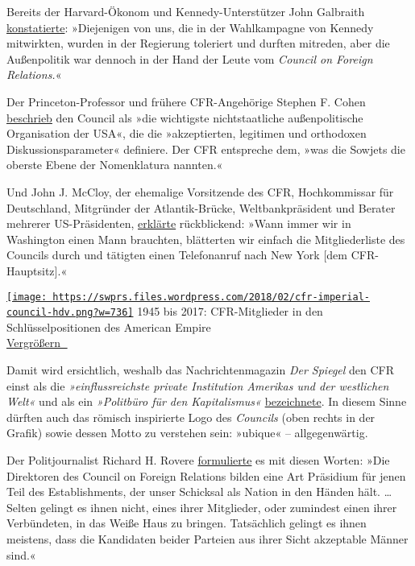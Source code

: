 Bereits der Harvard-Ökonom und Kennedy-Unterstützer John Galbraith
\href{https://books.google.com/books?id=U_WoXcJq_1wC\&q=\%22council+on+foreign+relations+people\%22}{konstatierte}:
»Diejenigen von uns, die in der Wahlkampagne von Kennedy mitwirkten,
wurden in der Regierung toleriert und durften mitreden, aber die
Außenpolitik war dennoch in der Hand der Leute vom \emph{Council on
Foreign Relations.}«

Der Princeton-Professor und frühere CFR-Angehörige Stephen F. Cohen
\href{https://www.thenation.com/article/the-american-bipartisan-policy-establishment-declares-its-second-cold-war-vs-russia-after-years-of-denying-it/}{beschrieb}
den Council als »die wichtigste nichtstaatliche außenpolitische
Organisation der USA«, die die »akzeptierten, legitimen und orthodoxen
Diskussionsparameter« definiere. Der CFR entspreche dem, »was die
Sowjets die oberste Ebene der Nomenklatura nannten.«

Und John J. McCloy, der ehemalige Vorsitzende des CFR, Hochkommissar für
Deutschland, Mitgründer der Atlantik-Brücke, Weltbankpräsident und
Berater mehrerer US-Präsidenten,
\href{http://www.nytimes.com/1971/11/21/archives/is-it-a-club-seminar-presidium-invisible-government-the-council-on-.html}{erklärte}
rückblickend: »Wann immer wir in Washington einen Mann brauchten,
blätterten wir einfach die Mitgliederliste des Councils durch und
tätigten einen Telefonanruf nach New York {[}dem CFR-Hauptsitz{]}.«

\href{https://swprs.files.wordpress.com/2018/02/cfr-imperial-council-hdv.png}{\texttt{[image: https://swprs.files.wordpress.com/2018/02/cfr-imperial-council-hdv.png?w=736]}}
1945 bis 2017: CFR-Mitglieder in den Schlüsselpositionen des American
Empire\\
\href{https://swprs.files.wordpress.com/2018/02/cfr-imperial-council-hdv.png}{Vergrößern
🔎}

Damit wird ersichtlich, weshalb das Nachrichtenmagazin \emph{Der
Spiegel} den CFR einst als die \emph{»einflussreichste private
Institution Amerikas und der westlichen Welt«} und als ein
\emph{»Politbüro für den Kapitalismus«}
\href{http://magazin.spiegel.de/EpubDelivery/spiegel/pdf/41389590}{bezeichnete}.
In diesem Sinne dürften auch das römisch inspirierte Logo des
\emph{Councils} (oben rechts in der Grafik) sowie dessen Motto zu
verstehen sein: »ubique« -- allgegenwärtig.

Der Politjournalist Richard H. Rovere
\href{http://archive.wilsonquarterly.com/sites/default/files/articles/WQ_VOL2_SU_1978_Article_05.pdf}{formulierte}
es mit diesen Worten: »Die Direktoren des Council on Foreign Relations
bilden eine Art Präsidium für jenen Teil des Establishments, der unser
Schicksal als Nation in den Händen hält. \ldots{} Selten gelingt es
ihnen nicht, eines ihrer Mitglieder, oder zumindest einen ihrer
Verbündeten, in das Weiße Haus zu bringen. Tatsächlich gelingt es ihnen
meistens, dass die Kandidaten beider Parteien aus ihrer Sicht akzeptable
Männer sind.«

